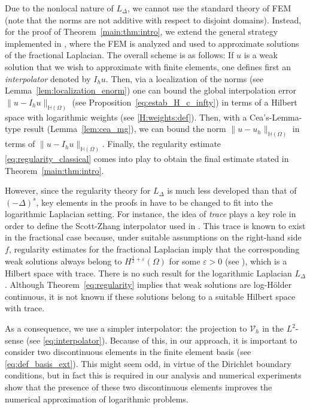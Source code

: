 \documentclass[11 pt]{article}
\numberwithin{equation}{section}
\def\eps{\varepsilon}
\begin{document}
 Due to the nonlocal nature of $L_\Delta$, we cannot use the standard theory of FEM (note that the norms are not additive with respect to disjoint domains). Instead, for the proof of Theorem~\ref{main:thm:intro}, we extend the general strategy implemented in \cite{Bor17}, where the FEM is analyzed and used to approximate solutions of the fractional Laplacian.  The overall scheme is as follows: If $u$ is a weak solution that we wish to approximate with finite elements, one defines first an \emph{interpolator} denoted by $I_h u$.  Then, via a localization of the norms (see Lemma~\ref{lem:localization_enorm}) one can bound the global interpolation error $\|u-I_h u\|_{\mathbb H(\Omega)}$ (see Proposition~\ref{eq:estab_H_c_infty}) in terms of a Hilbert space with logarithmic weights (see \eqref{H:weights:def}).  Then, with a Cea's-Lemma-type result (Lemma~\ref{lem:cea_mg}), we can bound the norm $\|u-u_h\|_{\mathbb H(\Omega)}$ in terms of $\|u-I_h u\|_{\mathbb H(\Omega)}$.  Finally, the regularity estimate \eqref{eq:regularity_classical} comes into play to obtain the final estimate stated in Theorem~\ref{main:thm:intro}.

 However, since the regularity theory for $L_\Delta$ is much less developed than that of $(-\Delta)^s$, key elements in the proofs in \cite{Bor17} have to be changed to fit into the logarithmic Laplacian setting.  For instance, the idea of \emph{trace} plays a key role in order to define the Scott-Zhang interpolator used in \cite{Bor17}. This trace is known to exist in the fractional case because, under suitable assumptions on the right-hand side $f$, regularity estimates for the fractional Laplacian imply that the corresponding weak solutions always belong to $H^{\frac{1}{2}+\eps}(\Omega)$ for some $\eps>0$ (see \cite[Theorem 2.3.6]{Bor17}), which is a Hilbert space with trace.  There is no such result for the logarithmic Laplacian $L_\Delta$.  Although Theorem~\ref{eq:regularity} implies that weak solutions are log-Hölder continuous, it is not known if these solutions belong to a suitable Hilbert space with trace.

 As a consequence, we use a simpler interpolator: the projection to $\mathcal V_h$ in the $L^2$-sense (see \eqref{eq:interpolator}). Because of this, in our approach, it is important to consider two discontinuous elements in the finite element basis (see \eqref{eq:def_basis_ext}).  This might seem odd, in virtue of the Dirichlet boundary conditions, but in fact this is required in our analysis and numerical experiments show that the presence of these two discontinuous elements improves the numerical approximation of logarithmic problems.
\end{document}
